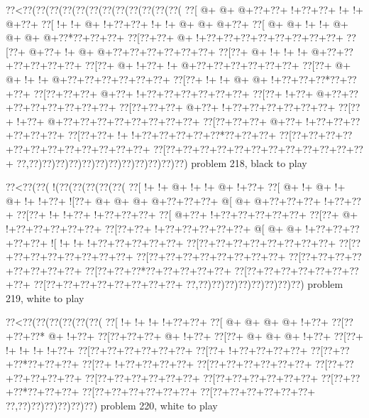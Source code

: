 \vbox{\vbox{\goo
\0??<\0??(\0??(\0??(\0??(\0??(\0??(\0??(\0??(\0??(\0??(\0??(\0??(
\0??[\- @+\- @+\- @+\0??+\0??+\- !+\0??+\0??+\- !+\- !+\- @+\0??+
\0??[\- !+\- !+\- @+\- !+\0??+\0??+\- !+\- !+\- @+\- @+\- @+\0??+
\0??[\- @+\- @+\- !+\- !+\- @+\- @+\- @+\- @+\0??*\0??+\0??+\0??+
\0??[\0??+\0??+\- @+\- !+\0??+\0??+\0??+\0??+\0??+\0??+\0??+\0??+
\0??[\0??+\- @+\0??+\- !+\- @+\- @+\0??+\0??+\0??+\0??+\0??+\0??+
\0??[\0??+\- @+\- !+\- !+\- !+\- @+\0??+\0??+\0??+\0??+\0??+\0??+
\0??[\0??+\- @+\- !+\0??+\- !+\- @+\0??+\0??+\0??+\0??+\0??+\0??+
\0??[\0??+\- @+\- @+\- !+\- !+\- @+\0??+\0??+\0??+\0??+\0??+\0??+
\0??[\0??+\- !+\- !+\- @+\- @+\- !+\0??+\0??+\0??*\0??+\0??+\0??+
\0??[\0??+\0??+\0??+\- @+\0??+\- !+\0??+\0??+\0??+\0??+\0??+\0??+
\0??[\0??+\- !+\0??+\- @+\0??+\0??+\0??+\0??+\0??+\0??+\0??+\0??+
\0??[\0??+\0??+\0??+\- @+\0??+\- !+\0??+\0??+\0??+\0??+\0??+\0??+
\0??[\0??+\- !+\0??+\- @+\0??+\0??+\0??+\0??+\0??+\0??+\0??+\0??+
\0??[\0??+\0??+\0??+\- @+\0??+\- !+\0??+\0??+\0??+\0??+\0??+\0??+
\0??[\0??+\0??+\- !+\- !+\0??+\0??+\0??+\0??+\0??*\0??+\0??+\0??+
\0??[\0??+\0??+\0??+\0??+\0??+\0??+\0??+\0??+\0??+\0??+\0??+\0??+
\0??[\0??+\0??+\0??+\0??+\0??+\0??+\0??+\0??+\0??+\0??+\0??+\0??+
\0??,\0??)\0??)\0??)\0??)\0??)\0??)\0??)\0??)\0??)\0??)\0??)\0??)
}
\hfil problem 218, black to play\hfil\break
}

\vbox{\vbox{\goo
\0??<\0??(\0??(\- !(\0??(\0??(\0??(\0??(\0??(
\0??[\- !+\- !+\- @+\- !+\- !+\- @+\- !+\0??+
\0??[\- @+\- !+\- @+\- !+\- @+\- !+\- !+\0??+
\- ![\0??+\- @+\- @+\- @+\- @+\0??+\0??+\0??+
\- @[\- @+\- @+\0??+\0??+\0??+\- !+\0??+\0??+
\0??[\0??+\- !+\- !+\0??+\- !+\0??+\0??+\0??+
\0??[\- @+\0??+\- !+\0??+\0??+\0??+\0??+\0??+
\0??[\0??+\- @+\- !+\0??+\0??+\0??+\0??+\0??+
\0??[\0??+\0??+\- !+\0??+\0??+\0??+\0??+\0??+
\- @[\- @+\- @+\- !+\0??+\0??+\0??+\0??+\0??+
\- ![\- !+\- !+\- !+\0??+\0??+\0??+\0??+\0??+
\0??[\0??+\0??+\0??+\0??+\0??+\0??+\0??+\0??+
\0??[\0??+\0??+\0??+\0??+\0??+\0??+\0??+\0??+
\0??[\0??+\0??+\0??+\0??+\0??+\0??+\0??+\0??+
\0??[\0??+\0??+\0??+\0??+\0??+\0??+\0??+\0??+
\0??[\0??+\0??+\0??*\0??+\0??+\0??+\0??+\0??+
\0??[\0??+\0??+\0??+\0??+\0??+\0??+\0??+\0??+
\0??[\0??+\0??+\0??+\0??+\0??+\0??+\0??+\0??+
\0??,\0??)\0??)\0??)\0??)\0??)\0??)\0??)\0??)
}
\hfil problem 219, white to play\hfil\break
}

\vbox{\vbox{\goo
\0??<\0??(\0??(\0??(\0??(\0??(\0??(
\0??[\- !+\- !+\- !+\- !+\0??+\0??+
\0??[\- @+\- @+\- @+\- @+\- !+\0??+
\0??[\0??+\0??+\0??*\- @+\- !+\0??+
\0??[\0??+\0??+\0??+\- @+\- !+\0??+
\0??[\0??+\- @+\- @+\- @+\- !+\0??+
\0??[\0??+\- !+\- !+\- !+\- !+\0??+
\0??[\0??+\0??+\0??+\0??+\0??+\0??+
\0??[\0??+\- !+\0??+\0??+\0??+\0??+
\0??[\0??+\0??+\0??*\0??+\0??+\0??+
\0??[\0??+\- !+\0??+\0??+\0??+\0??+
\0??[\0??+\0??+\0??+\0??+\0??+\0??+
\0??[\0??+\0??+\0??+\0??+\0??+\0??+
\0??[\0??+\0??+\0??+\0??+\0??+\0??+
\0??[\0??+\0??+\0??+\0??+\0??+\0??+
\0??[\0??+\0??+\0??*\0??+\0??+\0??+
\0??[\0??+\0??+\0??+\0??+\0??+\0??+
\0??[\0??+\0??+\0??+\0??+\0??+\0??+
\0??,\0??)\0??)\0??)\0??)\0??)\0??)
}
\hfil problem 220, white to play\hfil\break
}

